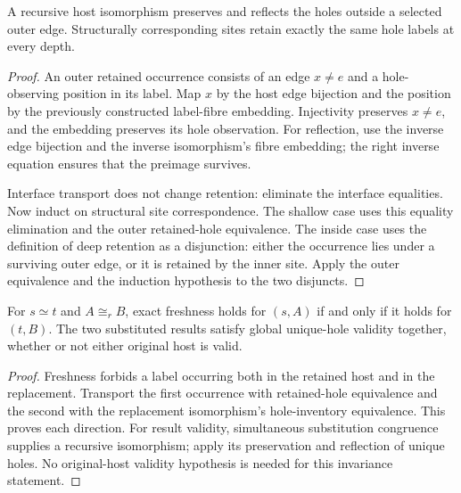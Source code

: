 \begin{lemma}
A recursive host isomorphism preserves and reflects the holes outside a
selected outer edge. Structurally corresponding sites retain exactly the same
hole labels at every depth.
\end{lemma}
\begin{proof}
An outer retained occurrence consists of an edge $x\ne e$ and a hole-observing
position in its label. Map $x$ by the host edge bijection and the position by
the previously constructed label-fibre embedding. Injectivity preserves
$x\ne e$, and the embedding preserves its hole observation. For reflection,
use the inverse edge bijection and the inverse isomorphism's fibre embedding;
the right inverse equation ensures that the preimage survives.

Interface transport does not change retention: eliminate the interface
equalities. Now induct on structural site correspondence. The shallow case
uses this equality elimination and the outer retained-hole equivalence. The
inside case uses the definition of deep retention as a disjunction: either
the occurrence lies under a surviving outer edge, or it is retained by the
inner site. Apply the outer equivalence and the induction hypothesis to the
two disjuncts.
\end{proof}

\begin{lemma}
For $s\simeq t$ and $A\cong_r B$, exact freshness holds for $(s,A)$ if and
only if it holds for $(t,B)$. The two substituted results satisfy global
unique-hole validity together, whether or not either original host is valid.
\end{lemma}
\begin{proof}
Freshness forbids a label occurring both in the retained host and in the
replacement. Transport the first occurrence with retained-hole equivalence and
the second with the replacement isomorphism's hole-inventory equivalence. This
proves each direction. For result validity, simultaneous substitution
congruence supplies a recursive isomorphism; apply its preservation and
reflection of unique holes. No original-host validity hypothesis is needed
for this invariance statement.
\end{proof}

